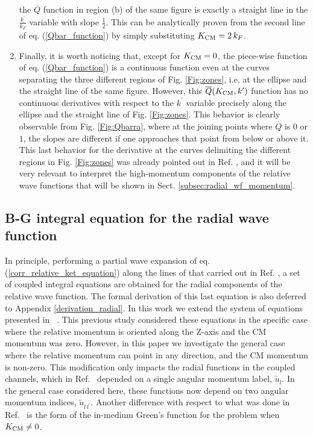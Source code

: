 \documentclass[aps,twocolumn,showpacs,preprintnumbers,amsmath,amssymb,nofootinbib,superscriptaddress,showkeys,noeprint]{revtex4-1}
\begin{document}
\begin{enumerate}
  the $\overline{Q}$ function in region (b) of the same figure is
  exactly a straight line in the $\frac{k^\prime}{k_F}$ variable with
  slope $\frac12$. This can be analytically proven from the second
  line of eq. (\ref{Qbar_function}) by simply substituting $K_{\rm
    CM}=2\,k_F$.
\item Finally, it is worth noticing that, except for $K_{\rm CM}=0$,
  the piece-wise function of eq. (\ref{Qbar_function}) is a continuous
  function even at the curves separating the three different regions
  of Fig. \ref{Fig:zones}, i.e, at the ellipse and the straight line
  of the same figure. However, this $\overline{Q}(K_{\rm
    CM},k^\prime)$ function has no continuous derivatives with respect
  to the $k^\prime$ variable precisely along the ellipse and the
  straight line of Fig. \ref{Fig:zones}. This behavior is clearly
  observable from Fig. \ref{Fig:Qbarra}, where at the joining points
  where $\overline{Q}$ is $0$ or $1$, the slopes are different if one
  approaches that point from below or above it. This last behavior for
  the derivative at the curves delimiting the different regions in
  Fig. \ref{Fig:zones} was already pointed out in Ref.
  \cite{Haftel:1970zz}, and it will be very relevant to interpret the
  high-momentum components of the relative wave functions that will be
  shown in Sect. \ref{subsec:radial_wf_momentum}.
\end{enumerate}

\subsection{B-G integral equation for the radial wave function}
\label{subsec:radial}
In principle, performing a partial wave expansion of eq.
(\ref{corr_relative_ket_equation}) along the lines of that carried out
in Ref. \cite{Brueckner:1958zz}, a set of coupled integral equations
are obtained for the radial components of the relative wave function.
The formal derivation of this last equation is also deferred to
Appendix \ref{derivation_radial}. In this work we extend the system of
equations presented in ~\cite{RuizSimo:2017tcb}. This previous study
considered these equations in the specific case where the relative
momentum is oriented along the Z-axis and the CM momentum was zero.
However, in this paper we investigate the general case where the
relative momentum can point in any direction, and the CM momentum is
non-zero.  This modification only impacts the radial functions in the
coupled channels, which in Ref.~\cite{RuizSimo:2017tcb} depended on a
single angular momentum label, $\widetilde{u}_l$. In the general case
considered here, these functions now depend on two angular momentum
indices, $\widetilde{u}_{l\,l^\prime}$.  Another difference with
respect to what was done in Ref.~\cite{RuizSimo:2017tcb} is the form
of the in-medium Green's function for the problem when $K_{\rm CM}\neq
0$.
\end{document}
